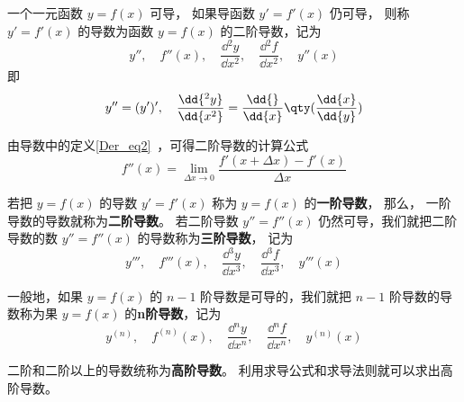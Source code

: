 
\begin{issues}
\end{issues}


一个一元函数 $y=f(x)$ 可导， 如果导函数 $y'=f'(x)$ 仍可导， 则称 $y'=f'(x)$ 的导数为函数 $y=f(x)$ 的二阶导数，记为
\begin{equation}
y'',\quad f''(x),\quad \frac{\dd{^2y}}{\dd{x^2}},\quad \frac{\dd{^2f}}{\dd{x^2}},\quad y''(x)
\end{equation}
即
\begin{equation}
y''=(y')',\quad\frac{\dd{^2y}}{\dd{x^2}}=\frac{\dd{ }}{\dd{x}}\qty(\frac{\dd{x}}{\dd{y}})
\end{equation}

由导数中的定义\autoref{Der_eq2}~，可得二阶导数的计算公式
\begin{equation}
f''(x)=\lim_{\Delta x \to 0} \frac{f'(x+ \Delta x)-f'(x)}{\Delta x}
\end{equation}

若把 $y=f(x)$ 的导数 $y'=f'(x)$ 称为 $y=f(x)$ 的\textbf{一阶导数}， 那么， 一阶导数的导数就称为\textbf{二阶导数}。 若二阶导数 $y''=f''(x)$ 仍然可导，我们就把二阶导数的数 $y''=f''(x)$ 的导数称为\textbf{三阶导数}， 记为
\begin{equation}
y''',\quad f'''(x),\quad \frac{\dd{^3y}}{\dd{x^3}},\quad \frac{\dd{^3f}}{\dd{x^3}},\quad y'''(x)
\end{equation}

一般地，如果 $y=f(x)$ 的 $n-1$ 阶导数是可导的，我们就把 $n-1$ 阶导数的导数称为果 $y=f(x)$ 的\textbf{n阶导数}，记为
\begin{equation}
y^{(n)},\quad f^{(n)}(x),\quad \frac{\dd{^ny}}{\dd{x^n}},\quad \frac{\dd{^nf}}{\dd{x^n}},\quad y^{(n)}(x)
\end{equation}

二阶和二阶以上的导数统称为\textbf{高阶导数}。 利用求导公式和求导法则就可以求出高阶导数。

